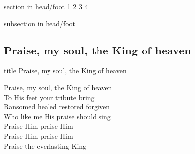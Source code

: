 \documentclass{beamer}
\begin{document}
{
{ 
 {
 \begin{beamercolorbox}[ht=4.5ex,dp=1.5ex,%
      leftskip=.3cm,rightskip=.3cm plus1fil]{section in head/foot}
 \fontsize{12}{25}\selectfont 
\hyperlink{Praise, my soul, the King of heaven[]1}{1}
\hyperlink{Praise, my soul, the King of heaven[]2}{2}
\hyperlink{Praise, my soul, the King of heaven[]3}{3}
\hyperlink{Praise, my soul, the King of heaven[]4}{4}
 
 \end{beamercolorbox}%
  \begin{beamercolorbox}[ht=2.5ex,dp=1.125ex,%
   leftskip=.3cm,rightskip=.3cm plus1fil]{subsection in head/foot}
   \insertauthor
 \end{beamercolorbox}%
 }
}
\subsection{ Praise, my soul, the King of heaven }

\hypertarget{Praise, my soul, the King of heaven[]}{}
\begin{frame}{}
 \vfill
  \centering
  \begin{beamercolorbox}[sep=8pt,center,shadow=true,rounded=true]{title}
    Praise, my soul, the King of heaven    
  \end{beamercolorbox}
  \vfill
\end{frame}

\hypertarget{Praise, my soul, the King of heaven[]1}{}
\begin{frame}{}
\fontsize{ 20 }{ 27 }\selectfont

Praise, my soul, the King of heaven\\ 
To His feet your tribute bring\\ 
Ransomed healed restored forgiven\\ 
Who like me His praise should sing\\ 
Praise Him praise Him\\ 
Praise Him praise Him\\ 
Praise the everlasting King 

\end{frame}

\hypertarget{Praise, my soul, the King of heaven[]2}{}
\begin{frame}{}
\fontsize{ 20 }{ 27 }\selectfont


\end{frame}}
\end{document}
